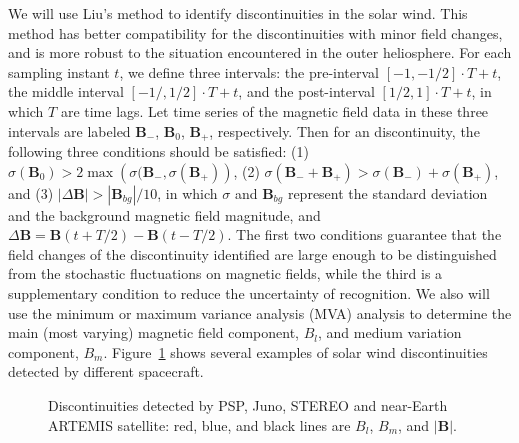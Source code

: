 \documentclass[
  letterpaper,
  DIV=11,
  numbers=noendperiod]{scrartcl}
\begin{document}
We will use Liu's \citep{liu2022a} method to identify discontinuities in
the solar wind. This method has better compatibility for the
discontinuities with minor field changes, and is more robust to the
situation encountered in the outer heliosphere. For each sampling
instant \(t\), we define three intervals: the pre-interval
\([-1,-1/2]\cdot T+t\), the middle interval \([-1/,1/2]\cdot T+t\), and
the post-interval \([1/2,1]\cdot T+t\), in which \(T\) are time lags.
Let time series of the magnetic field data in these three intervals are
labeled \({\mathbf B}_-\), \({\mathbf B}_0\), \({\mathbf B}_+\),
respectively. Then for an discontinuity, the following three conditions
should be satisfied: (1)
\(\sigma({\mathbf B}_0)>2\max\left(\sigma({\mathbf B}_-, \sigma({\mathbf B}_+)\right)\),
(2)
\(\sigma\left({\mathbf B}_-+{\mathbf B}_+\right)>\sigma({\mathbf B}_-)+\sigma({\mathbf B}_+)\),
and (3) \(|\Delta {\mathbf B}|>|{\mathbf B}_{bg}|/10\), in which
\(\sigma\) and \({\mathbf B}_{bg}\) represent the standard deviation and
the background magnetic field magnitude, and
\(\Delta {\mathbf B}={\mathbf B}(t+T/2)-{\mathbf B}(t-T/2)\). The first
two conditions guarantee that the field changes of the discontinuity
identified are large enough to be distinguished from the stochastic
fluctuations on magnetic fields, while the third is a supplementary
condition to reduce the uncertainty of recognition. We also will use the
minimum or maximum variance analysis (MVA) analysis
\citep{sonnerupMinimumMaximumVariance1998, sonnerupMagnetopauseStructureAttitude1967}
to determine the main (most varying) magnetic field component, \(B_l\),
and medium variation component, \(B_m\). Figure~\ref{fig-examples} shows
several examples of solar wind discontinuities detected by different
spacecraft.

\begin{figure}


\caption{\label{fig-examples}Discontinuities detected by PSP, Juno,
STEREO and near-Earth ARTEMIS satellite: red, blue, and black lines are
\(B_l\), \(B_m\), and \(|{\mathbf B}|\).}

\end{figure}%
\end{document}

